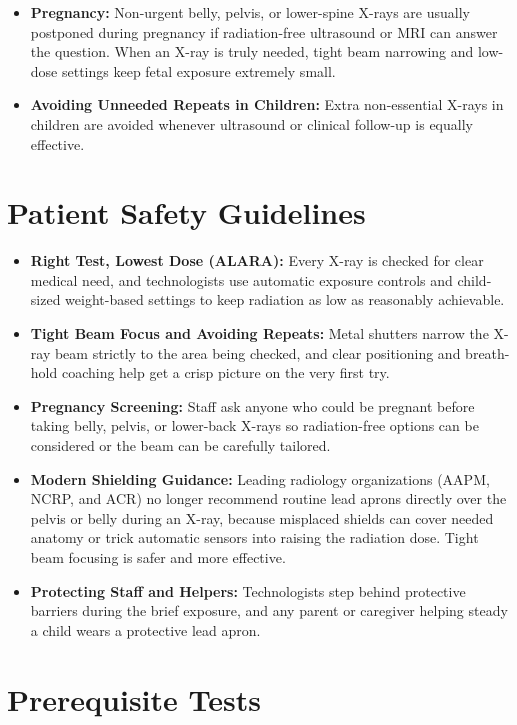 \begin{itemize}
    \item \textbf{Pregnancy:} Non-urgent belly, pelvis, or lower-spine X-rays are usually postponed during pregnancy if radiation-free ultrasound or MRI can answer the question. When an X-ray is truly needed, tight beam narrowing and low-dose settings keep fetal exposure extremely small.
    \item \textbf{Avoiding Unneeded Repeats in Children:} Extra non-essential X-rays in children are avoided whenever ultrasound or clinical follow-up is equally effective.
\end{itemize}

\section{Patient Safety Guidelines}

\begin{itemize}
    \item \textbf{Right Test, Lowest Dose (ALARA):} Every X-ray is checked for clear medical need, and technologists use automatic exposure controls and child-sized weight-based settings to keep radiation as low as reasonably achievable.
    \item \textbf{Tight Beam Focus and Avoiding Repeats:} Metal shutters narrow the X-ray beam strictly to the area being checked, and clear positioning and breath-hold coaching help get a crisp picture on the very first try.
    \item \textbf{Pregnancy Screening:} Staff ask anyone who could be pregnant before taking belly, pelvis, or lower-back X-rays so radiation-free options can be considered or the beam can be carefully tailored.
    \item \textbf{Modern Shielding Guidance:} Leading radiology organizations (AAPM, NCRP, and ACR) no longer recommend routine lead aprons directly over the pelvis or belly during an X-ray, because misplaced shields can cover needed anatomy or trick automatic sensors into raising the radiation dose. Tight beam focusing is safer and more effective.
    \item \textbf{Protecting Staff and Helpers:} Technologists step behind protective barriers during the brief exposure, and any parent or caregiver helping steady a child wears a protective lead apron.
\end{itemize}

\section{Prerequisite Tests}

